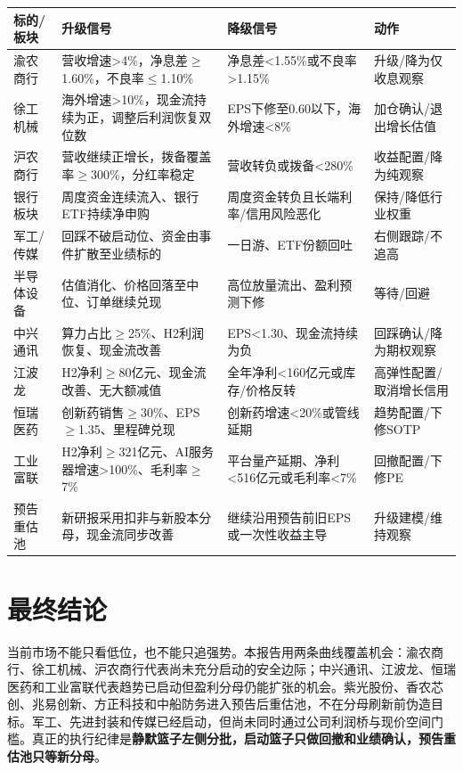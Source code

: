\begin{exhibitbox}
\begin{tabularx}{\textwidth}{L{2.2cm}L{3.8cm}L{3.8cm}X}
\toprule
\textbf{标的/板块} & \textbf{升级信号} & \textbf{降级信号} & \textbf{动作} \\
\midrule
渝农商行 & 营收增速>4\%，净息差$\geq$1.60\%，不良率$\leq$1.10\% & 净息差<1.55\%或不良率>1.15\% & 升级/降为仅收息观察 \\
徐工机械 & 海外增速>10\%，现金流持续为正，调整后利润恢复双位数 & EPS下修至0.60以下，海外增速<8\% & 加仓确认/退出增长估值 \\
沪农商行 & 营收继续正增长，拨备覆盖率$\geq$300\%，分红率稳定 & 营收转负或拨备<280\% & 收益配置/降为纯观察 \\
银行板块 & 周度资金连续流入、银行ETF持续净申购 & 周度资金转负且长端利率/信用风险恶化 & 保持/降低行业权重 \\
军工/传媒 & 回踩不破启动位、资金由事件扩散至业绩标的 & 一日游、ETF份额回吐 & 右侧跟踪/不追高 \\
半导体设备 & 估值消化、价格回落至中位、订单继续兑现 & 高位放量流出、盈利预测下修 & 等待/回避 \\
中兴通讯 & 算力占比$\geq$25\%、H2利润恢复、现金流改善 & EPS<1.30、现金流持续为负 & 回踩确认/降为期权观察 \\
江波龙 & H2净利$\geq$80亿元、现金流改善、无大额减值 & 全年净利<160亿元或库存/价格反转 & 高弹性配置/取消增长信用 \\
恒瑞医药 & 创新药销售$\geq$30\%、EPS$\geq$1.35、里程碑兑现 & 创新药增速<20\%或管线延期 & 趋势配置/下修SOTP \\
工业富联 & H2净利$\geq$321亿元、AI服务器增速>100\%、毛利率$\geq$7\% & 平台量产延期、净利<516亿元或毛利率<7\% & 回撤配置/下修PE \\
预告重估池 & 新研报采用扣非与新股本分母，现金流同步改善 & 继续沿用预告前旧EPS或一次性收益主导 & 升级建模/维持观察 \\
\bottomrule
\end{tabularx}
\end{exhibitbox}

\section{最终结论}

当前市场不能只看低位，也不能只追强势。本报告用两条曲线覆盖机会：渝农商行、徐工机械、沪农商行代表尚未充分启动的安全边际；中兴通讯、江波龙、恒瑞医药和工业富联代表趋势已启动但盈利分母仍能扩张的机会。紫光股份、香农芯创、兆易创新、方正科技和中船防务进入预告后重估池，不在分母刷新前伪造目标。军工、先进封装和传媒已经启动，但尚未同时通过公司利润桥与现价空间门槛。真正的执行纪律是\textbf{静默篮子左侧分批，启动篮子只做回撤和业绩确认，预告重估池只等新分母}。
